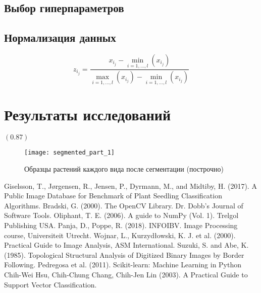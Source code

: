 \documentclass[12pt]{article}
\begin{document}
\subsection{Выбор гиперпараметров}


\subsection{Нормализация данных}


\begin{equation}
	z_{i_j} = \frac{x_{i_j} - \min_{i = 1, \dots, l}(x_{i_j})}{\max_{i = 1, \dots, l}(x_{i_j}) - \min_{i = 1, \dots, l}(x_{i_j})}
	\label{eq_8}
\end{equation}

\section{Результаты исследований}
$(0.87)$
\begin{figure}[h!]
	\centering
	\texttt{[image: segmented\_part\_1]}
	\caption{Образцы растений каждого вида после сегментации (построчно)}
	\label{fig_iwf}
\end{figure}
\newpage

\begin{thebibliography}{}
	 Giselsson, T., Jørgensen, R., Jensen, P., Dyrmann, M., and Midtiby, H. (2017). A Public Image Database for Benchmark of Plant Seedling Classification Algorithms. 
	 Bradski, G. (2000). The OpenCV Library. Dr. Dobb's Journal of Software Tools.
	 Oliphant, T. E. (2006). A guide to NumPy (Vol. 1). Trelgol Publishing USA.
	 Panja, D., Poppe, R. (2018). INFOIBV. Image Processing course, Universiteit Utrecht.
	 Wojnar, L., Kurzydłowski, K. J. et al. (2000). Practical Guide to Image Analysis, ASM International.
	 Suzuki, S. and Abe, K. (1985). Topological Structural Analysis of Digitized Binary Images by Border Following.
	 Pedregosa et al. (2011). Scikit-learn: Machine Learning in Python
	 Chih-Wei Hsu, Chih-Chung Chang, Chih-Jen Lin (2003). A Practical Guide to Support Vector Classification.
\end{thebibliography}
\end{document}
